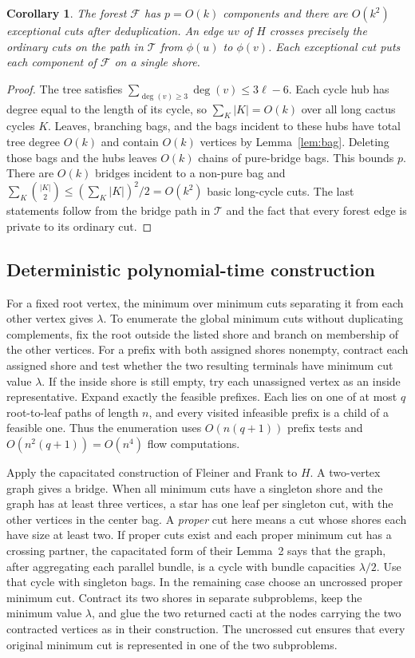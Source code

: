 \documentclass[10pt,letterpaper]{article}
\newtheorem{corollary}{Corollary}
\newcommand{\forest}{\mathcal F}
\newcommand{\tree}{\mathcal T}
\begin{document}
\begin{corollary}\label{cor:forest}
The forest \(\forest\) has \(p=O(k)\) components and there are \(O(k^2)\) exceptional cuts after deduplication. An edge \(uv\) of \(H\) crosses precisely the ordinary cuts on the path in \(\tree\) from \(\phi(u)\) to \(\phi(v)\). Each exceptional cut puts each component of \(\forest\) on a single shore.
\end{corollary}
\begin{proof}
The tree satisfies \(\sum_{\deg(v)\ge 3}\deg(v)\le 3\ell-6\). Each cycle hub has degree equal to the length of its cycle, so \(\sum_K |K|=O(k)\) over all long cactus cycles \(K\). Leaves, branching bags, and the bags incident to these hubs have total tree degree \(O(k)\) and contain \(O(k)\) vertices by Lemma~\ref{lem:bag}. Deleting those bags and the hubs leaves \(O(k)\) chains of pure-bridge bags. This bounds \(p\). There are \(O(k)\) bridges incident to a non-pure bag and \(\sum_K\binom{|K|}{2}\le(\sum_K |K|)^2/2=O(k^2)\) basic long-cycle cuts. The last statements follow from the bridge path in \(\tree\) and the fact that every forest edge is private to its ordinary cut.
\end{proof}

\subsection{Deterministic polynomial-time construction}\label{sec:construction}
For a fixed root vertex, the minimum over minimum cuts separating it from each other vertex gives \(\lambda\). To enumerate the global minimum cuts without duplicating complements, fix the root outside the listed shore and branch on membership of the other vertices. For a prefix with both assigned shores nonempty, contract each assigned shore and test whether the two resulting terminals have minimum cut value \(\lambda\). If the inside shore is still empty, try each unassigned vertex as an inside representative. Expand exactly the feasible prefixes. Each lies on one of at most \(q\) root-to-leaf paths of length \(n\), and every visited infeasible prefix is a child of a feasible one. Thus the enumeration uses \(O(n(q+1))\) prefix tests and \(O(n^2(q+1))=O(n^4)\) flow computations.

Apply the capacitated construction of Fleiner and Frank \cite[Lemma~2, Theorem~7, Remark~1]{FleinerFrank} to \(H\). A two-vertex graph gives a bridge. When all minimum cuts have a singleton shore and the graph has at least three vertices, a star has one leaf per singleton cut, with the other vertices in the center bag. A \emph{proper} cut here means a cut whose shores each have size at least two. If proper cuts exist and each proper minimum cut has a crossing partner, the capacitated form of their Lemma~2 says that the graph, after aggregating each parallel bundle, is a cycle with bundle capacities \(\lambda/2\). Use that cycle with singleton bags. In the remaining case choose an uncrossed proper minimum cut. Contract its two shores in separate subproblems, keep the minimum value \(\lambda\), and glue the two returned cacti at the nodes carrying the two contracted vertices as in their construction. The uncrossed cut ensures that every original minimum cut is represented in one of the two subproblems.
\end{document}
